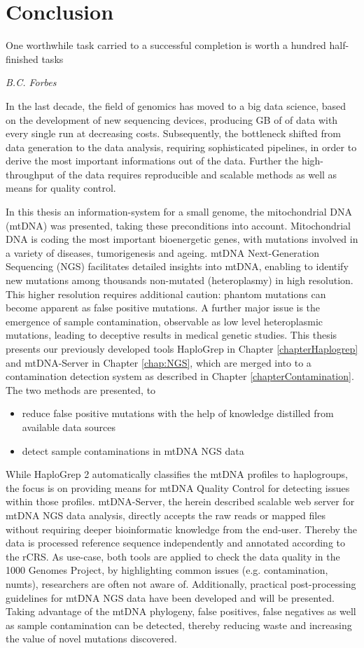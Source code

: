 \chapter{Conclusion}
\label{chap:conclusion}

\epigraph{One worthwhile task carried to a successful completion is worth a hundred half-finished tasks}{\textit{B.C. Forbes}}

In the last decade, the  field of genomics has moved to a big data science, based on the development of new sequencing devices, producing GB of of data with every single run at decreasing costs. Subsequently, the bottleneck shifted from data generation to the data analysis, requiring sophisticated pipelines, in order to derive the most important informations out of the data. Further the high-throughput of the data requires reproducible and scalable methods as well as means for quality control. 

In this thesis an information-system for a small genome, the mitochondrial DNA (mtDNA) was presented, taking these preconditions into account. Mitochondrial DNA is coding the most important bioenergetic genes, with mutations involved in a variety of diseases, tumorigenesis and ageing. mtDNA Next-Generation Sequencing (NGS) facilitates detailed insights into mtDNA, enabling to identify new mutations among thousands non-mutated (heteroplasmy) in high resolution. This higher resolution requires additional caution: phantom mutations can become apparent as false positive mutations. A further major issue is the emergence of sample contamination, observable as low level heteroplasmic mutations, leading to deceptive results in medical genetic studies.
This thesis presents our previously developed tools HaploGrep in Chapter \ref{chapterHaplogrep} and mtDNA-Server in Chapter \ref{chap:NGS}, which are merged into to a contamination detection system as described in Chapter \ref{chapterContamination}. The two methods are presented, to
\begin{itemize}
\item reduce false positive mutations with the help of knowledge distilled from available data sources  
\item detect sample contaminations in mtDNA NGS data
\end{itemize}
While HaploGrep 2 automatically classifies the mtDNA profiles to haplogroups, the focus is on providing means for mtDNA Quality Control for detecting issues within those profiles. 
mtDNA-Server, the herein described scalable web server for mtDNA NGS data analysis, directly accepts the raw reads or mapped files without requiring deeper bioinformatic knowledge from the end-user. Thereby the data is processed reference sequence independently and annotated according to the rCRS. 
As use-case, both tools are applied to check the data quality in the 1000 Genomes Project, by highlighting common issues (e.g. contamination, numts), researchers are often not aware of. Additionally, practical post-processing guidelines for mtDNA NGS data have been developed and will be presented. Taking advantage of the mtDNA phylogeny, false positives, false negatives as well as sample contamination can be detected, thereby reducing waste and increasing the value of novel mutations discovered.
